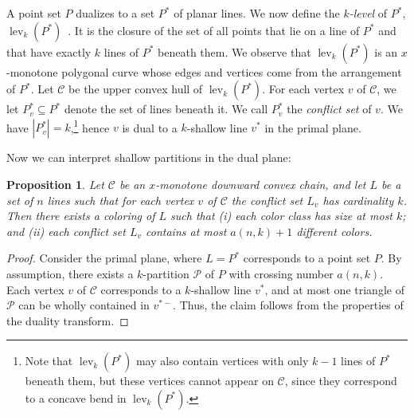 \documentclass{paper}
\DeclareMathOperator{\lev}{lev}
\newtheorem {prop}[theorem] {Proposition}
\begin{document}
A point set $P$ dualizes to a set $P^*$ of planar lines. We now
define the \emph{$k$-level} of $P^*$, $\lev_k(P^*)$~\cite{SharirAg95}. 
It is the closure of the set 
of all points that lie on a line of $P^*$ and 
that have exactly $k$ lines of $P^*$ beneath them. 
We observe that $\lev_k(P^*)$ is an $x$-monotone polygonal curve 
whose edges and vertices come from the arrangement
of $P^*$. 
Let $\mathcal{C}$ be the upper convex hull of $\lev_k(P^*)$.
For each vertex $v$ of $\mathcal{C}$, we let $P^*_{v} \subseteq P^*$ 
denote the set of lines
beneath it. We call $P^*_v$ the \emph{conflict set} of $v$. 
We have $|P^*_{v}| = k$,\footnote{Note 
that $\lev_k(P^*)$ may also contain vertices with
only $k-1$ lines of $P^*$ beneath them, but these vertices
cannot appear on $\mathcal{C}$, since they correspond to
a concave bend in $\lev_{k}(P^*)$.} 
hence $v$ is dual to
a $k$-shallow line $v^*$ in the primal plane.


Now we can interpret shallow partitions in the dual plane:
\begin{prop}\label{prop:dualpartition}
Let $\mathcal{C}$ be an $x$-monotone downward convex chain, and let
$L$ be a set of $n$ lines such that for each
vertex $v$ of $\mathcal{C}$ the conflict set $L_v$ has cardinality $k$.
Then there exists a coloring of $L$ 
such that (i) each color class 
has size at most $k$; and (ii) each conflict set $L_v$ contains
at most $a(n,k)+1$ different colors.
\end{prop}
\begin{proof}
Consider the primal plane, where $L = P^*$ corresponds to a point set $P$.
By assumption, there exists a $k$-partition $\mathcal{P}$ of $P$ 
with crossing number $a(n,k)$. Each vertex $v$ of $\mathcal{C}$ 
corresponds 
to a $k$-shallow line $v^*$, and at most one triangle of $\mathcal{P}$ 
can be wholly contained in $v^{*-}$. Thus, the claim follows from the 
properties of the duality transform.
\end{proof}
\end{document}
